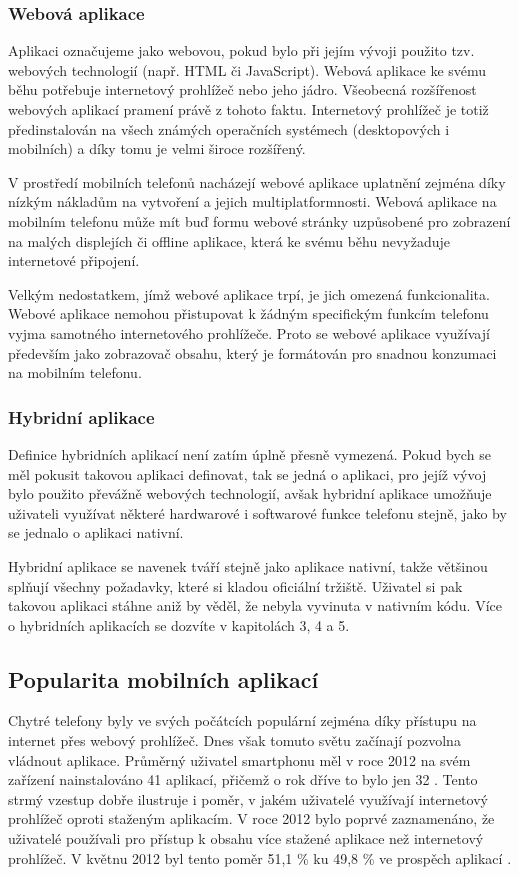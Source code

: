 \subsubsection{Webová aplikace}
Aplikaci označujeme jako webovou, pokud bylo při jejím vývoji použito tzv. webových technologií (např. HTML či JavaScript). Webová aplikace ke svému běhu potřebuje internetový prohlížeč nebo jeho jádro. Všeobecná rozšířenost webových aplikací pramení právě z tohoto faktu. Internetový prohlížeč je totiž předinstalován na všech známých operačních systémech (desktopových i mobilních) a díky tomu je velmi široce rozšířený.

V prostředí mobilních telefonů nacházejí webové aplikace uplatnění zejména díky nízkým nákladům na vytvoření a jejich multiplatformnosti. Webová aplikace na mobilním telefonu může mít buď formu webové stránky uzpůsobené pro zobrazení na malých displejích či offline aplikace, která ke svému běhu nevyžaduje internetové připojení.

Velkým nedostatkem, jímž webové aplikace trpí, je jich omezená funkcionalita. Webové aplikace nemohou přistupovat k žádným specifickým funkcím telefonu vyjma samotného internetového prohlížeče. Proto se webové aplikace využívají především jako zobrazovač obsahu, který je formátován pro snadnou konzumaci na mobilním telefonu.

\subsubsection{Hybridní aplikace}
Definice hybridních aplikací není zatím úplně přesně vymezená. Pokud bych se měl pokusit takovou aplikaci definovat, tak se jedná o aplikaci, pro jejíž vývoj bylo použito převážně webových technologií, avšak hybridní aplikace umožňuje uživateli využívat některé hardwarové i softwarové funkce telefonu stejně, jako by se jednalo o aplikaci nativní.

Hybridní aplikace se navenek tváří stejně jako aplikace nativní, takže většinou splňují všechny požadavky, které si kladou oficiální tržiště. Uživatel si pak takovou aplikaci stáhne aniž by věděl, že nebyla vyvinuta v nativním kódu. Více o hybridních aplikacích se dozvíte v kapitolách 3, 4 a 5. %

\subsection{Popularita mobilních aplikací}
Chytré telefony byly ve svých počátcích populární zejména díky přístupu na internet přes webový prohlížeč. Dnes však tomuto světu začínají pozvolna vládnout aplikace. Průměrný uživatel smartphonu měl v roce 2012 na svém zařízení nainstalováno 41 aplikací, přičemž o rok dříve to bylo jen 32 \cite{mobile_app_usage_statistics}. Tento strmý vzestup dobře ilustruje i poměr, v jakém uživatelé využívají internetový prohlížeč oproti staženým aplikacím. V roce 2012 bylo poprvé zaznamenáno, že uživatelé používali pro přístup k obsahu více stažené aplikace než internetový prohlížeč. V květnu 2012 byl tento poměr 51,1 \% ku 49,8 \% ve prospěch aplikací \cite{comscore_report_may}.

